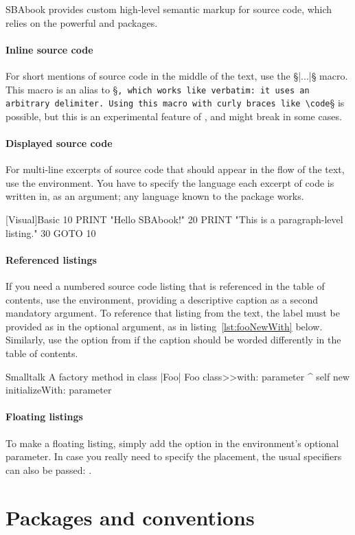 \documentclass[english,twoside,openany,showtrims]{sbabook}
\begin{document}
SBAbook provides custom high-level semantic markup for source code, which
relies on the powerful  and  packages.


\paragraph{Inline source code}
For short mentions of source code in the middle of the text, use the
\code§\code|...|§ macro.
This macro is an alias to \code§\lstinline§, which works like verbatim: it uses
an arbitrary delimiter.
Using this macro with curly braces like \code§§ is possible, but this
is an experimental feature of , and might break in some cases.


\paragraph{Displayed source code}
For multi-line excerpts of source code that should appear in the flow of the
text, use the  environment.
You have to specify the language each excerpt of code is written in, as an
argument; any language known to the  package works.

\begin{displaycode}{[Visual]Basic}
10 PRINT "Hello SBAbook!"
20 PRINT "This is a paragraph-level listing."
30 GOTO 10
\end{displaycode}


\paragraph{Referenced listings}
If you need a numbered source code listing that is referenced in the table of
contents, use the  environment, providing a descriptive caption as
a second mandatory argument.
To reference that listing from the text, the label must be provided as
 in the optional argument, as in
listing~\ref{lst:fooNewWith} below.
Similarly, use the  option from  if the caption
should be worded differently in the table of contents.

\begin{listing}[label=lst:fooNewWith]{Smalltalk}
{A factory method in class \code|Foo|}
Foo class>>with: parameter
  ^ self new
    initializeWith: parameter
\end{listing}


\paragraph{Floating listings}
To make a floating listing, simply add the  option in the
environment's optional parameter.
In case you really need to specify the placement, the usual specifiers can also
be passed: .


\section{Packages and conventions}



\clearpage
\textlatin{\lipsum[2-7]}
\end{document}
